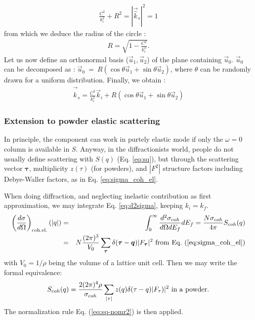 \begin{align}
\frac{C^2}{k_i^2} + R^2 = |\vec{\hat k}_s|^2 = 1
\end{align}
from which we deduce the radius of the circle :
\begin{align}
R = \sqrt{1 - \frac{C^2}{k_i^2}}.
\end{align}
Let us now define an orthonormal basis ($\vec{u}_1,\vec{u}_2$) of the plane containing $\vec{u}_0$.
$\vec{u}_0$ can be decomposed as : $\vec{u}_0~=~R(\cos \theta \vec{u}_1 + \sin \theta \vec{u}_2)$, where $\theta$ can be randomly drawn for a uniform distribution.
Finally, we obtain :
\begin{align}
\vec{\hat k}_s = \frac{C^2}{k_i^2} \vec{k}_i + R (\cos \theta \vec{u}_1 + \sin \theta \vec{u}_2)
\end{align}

\subsubsection{Extension to powder elastic scattering}

In principle, the component can work in purtely elastic mode if only the $\omega = 0$ column is available in $S$.
Anyway, in the diffractionists world, people do not usually define scattering with $S(q)$ (Eq. \ref{eq:sq}), but through the scattering vector $\boldsymbol{\tau}$, multiplicity $z(\tau)$ (for powders), and $|F^2|$ structure factors including Debye-Waller factors, as in Eq. \ref{eq:sigma_coh_el}.

When doing diffraction, and neglecting inelastic contribution as first approximation, we may integrate Eq. \ref{eq:d2sigma}, keeping $k_i = k_f$.
\begin{eqnarray}
\left(\frac{d\sigma}{d\Omega}\right)_{\rm coh.el.}(|q|) &=& \int_0^\infty \frac{d^2\sigma_{coh}}{d\Omega dE_f} dE_f = \frac{N \sigma_{coh}}{4\pi} S_{coh}(q) \\
& = & N\frac{(2\pi)^3}{V_0}\sum_{\boldsymbol{\tau}} \delta(\boldsymbol{\tau} - \boldsymbol{q})|F_{\boldsymbol{\tau}}|^2 {\rm\ from\ Eq.\ (\ref{eq:sigma_coh_el})}
\end{eqnarray}
with $V_0 = 1/\rho$ being the volume of a lattice unit cell. Then we may write the formal equivalence:
\begin{eqnarray}\label{eq:sq-F2}
S_{coh}(q) = \frac{2(2\pi)^4\rho}{\sigma_{coh}} \sum_{|\tau|} z(q) \delta(\tau - q) |F_\tau)|^2 {\rm\ in\ a\ powder.}
\end{eqnarray}
The normalization rule Eq. (\ref{eq:sq-nomr2}) is then applied.

